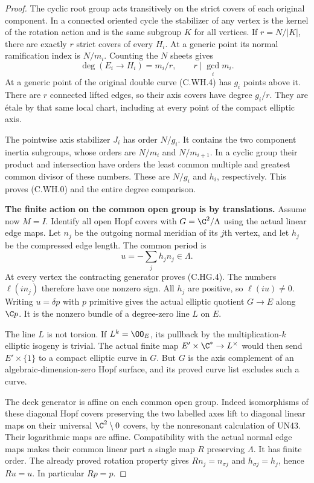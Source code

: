 \begin{proof}
The cyclic root group acts transitively
on the strict covers of each original
component. In a connected oriented
cycle the stabilizer of any vertex
is the kernel of the rotation action
and is the same subgroup $K$ for all
vertices. If $r=N/|K|$, there are
exactly $r$ strict covers of every
$H_i$. At a generic point its normal
ramification index is $N/m_i$.
Counting the $N$ sheets gives
\[
               \deg(E_i\to H_i)=m_i/r,
                    \qquad r\mid\gcd_i m_i.
\tag{C.WH.6}
\]
At a generic point of the original
double curve (C.WH.4) has $g_i$
points above it. There are $r$
connected lifted edges, so their
axis covers have degree $g_i/r$.
They are \'{e}tale by that same
local chart, including at every
point of the compact elliptic axis.

The pointwise axis stabilizer $J_i$
has order $N/g_i$. It contains the
two component inertia subgroups,
whose orders are $N/m_i$ and
$N/m_{i+1}$. In a cyclic group their
product and intersection have orders
the least common multiple and
greatest common divisor of these
numbers. These are $N/g_i$ and $h_i$,
respectively. This proves (C.WH.0)
and the entire degree comparison.

\par\medskip\noindent\textbf{The finite action on the common open group is by translations.}
Assume now $M=I$. Identify all open
Hopf covers with $G=\C^2/\Lambda$
using the actual linear edge maps.
Let $n_j$ be the outgoing normal
meridian of its $j$th vertex, and
let $h_j$ be the compressed edge
length. The common period is
\[
                u=-\sum_j h_j n_j\in\Lambda.
\tag{C.WH.7}
\]
At every vertex the contracting
generator proves (C.HG.4). The
numbers $\ell(i n_j)$ therefore
have one nonzero sign. All $h_j$
are positive, so $\ell(iu)\ne0$.
Writing $u=\delta p$ with $p$
primitive gives the actual elliptic
quotient $G\to E$ along $\C p$.
It is the nonzero bundle of a
degree-zero line $L$ on $E$.

The line $L$ is not torsion. If
$L^k=\OO_E$, its pullback by the
multiplication-$k$ elliptic isogeny
is trivial. The actual finite map
$E'\times\C^*\to L^\times$ would
then send $E'\times\{1\}$ to a
compact elliptic curve in $G$.
But $G$ is the axis complement of
an algebraic-dimension-zero Hopf
surface, and its proved curve list
excludes such a curve.

The deck generator is affine on
each common open group. Indeed
isomorphisms of these diagonal
Hopf covers preserving the two
labelled axes lift to diagonal
linear maps on their universal
$\C^2\setminus0$ covers, by the
nonresonant calculation of UN43.
Their logarithmic maps are affine.
Compatibility with the actual
normal edge maps makes their
common linear part a single map
$R$ preserving $\Lambda$. It has
finite order. The already proved
rotation property gives
$R n_j=n_{\sigma j}$ and
$h_{\sigma j}=h_j$, hence $Ru=u$.
In particular $Rp=p$.


\end{proof}

